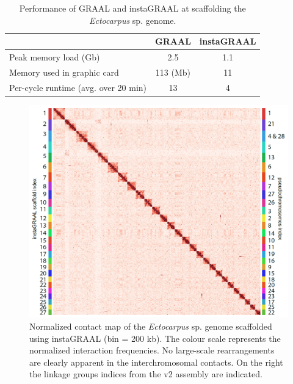 \begin{suppsection}
\begin{table}[ht]
\centering
\caption{Performance of GRAAL and instaGRAAL at scaffolding the \textit{Ectocarpus} sp. genome. }
\begin{tabular}{|l|c|c|}
\hline
    & \textbf{GRAAL} & \textbf{instaGRAAL} \\
\hline
Peak memory load (Gb) & 2.5 & 1.1 \\
Memory used in graphic card & 113 (Mb) & 11 \\
Per-cycle runtime (avg. over 20 min) & 13 & 4 \\
\hline
\end{tabular}
\label{tab:t5}
\end{table}

\begin{figure}[ht]
\centering
    \includegraphics[width=13.5cm]{fig/instagraal/s1.png}
    \caption{Normalized contact map of the \textit{Ectocarpus} sp. genome scaffolded using instaGRAAL (bin = 200 kb). The colour scale represents the normalized interaction frequencies. No large-scale rearrangements are clearly apparent in the interchromosomal contacts. On the right the linkage groups indices from the v2 assembly are indicated.}
    \label{fig:instagraal_s1}
\end{figure}


\end{suppsection}
